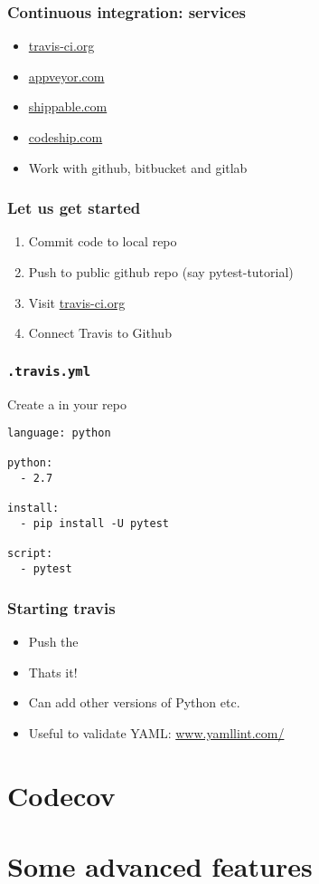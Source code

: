 \documentclass[14pt,compress]{beamer}
\begin{document}
\begin{frame}
  \frametitle{Continuous integration: services}
  \begin{itemize}
  \item \url{travis-ci.org}
  \item \url{appveyor.com}
  \item \url{shippable.com}
  \item \url{codeship.com}
  \item Work with github, bitbucket and gitlab
  \end{itemize}
\end{frame}

\begin{frame}
  \frametitle{Let us get started}
  \begin{enumerate}
  \item Commit code to local repo
  \item Push to public github repo (say pytest-tutorial)
  \item Visit \url{travis-ci.org}
  \item Connect Travis to Github
  \end{enumerate}
\end{frame}

\begin{frame}[fragile]
  \frametitle{\texttt{.travis.yml}}
  Create a  in your repo
  \begin{lstlisting}
language: python

python:
  - 2.7

install:
  - pip install -U pytest

script:
  - pytest
\end{lstlisting}
\end{frame}

\begin{frame}
  \frametitle{Starting travis}
  \begin{itemize}
  \item Push the 
  \item Thats it!
  \item Can add other versions of Python etc.
  \item Useful to validate YAML: \url{www.yamllint.com/}
  \end{itemize}
\end{frame}



\section{Codecov}


\section{Some advanced features}
\end{document}
